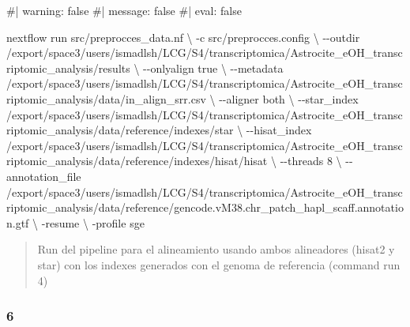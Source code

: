\documentclass[
  10pt,
]{article}
\newenvironment{Shaded}{\begin{snugshade}}{\end{snugshade}}
\newcommand{\NormalTok}[1]{\textcolor[rgb]{0.00,0.23,0.31}{#1}}
\begin{document}
\begin{Shaded}
\begin{Highlighting}[]
\NormalTok{\#| warning: false}
\NormalTok{\#| message: false}
\NormalTok{\#| eval: false}

\NormalTok{nextflow run src/preprocces\_data.nf \textbackslash{}}
\NormalTok{    {-}c src/preprocces.config \textbackslash{}}
\NormalTok{    {-}{-}outdir /export/space3/users/ismadlsh/LCG/S4/transcriptomica/Astrocite\_eOH\_transcriptomic\_analysis/results \textbackslash{}}
\NormalTok{    {-}{-}onlyalign true \textbackslash{}}
\NormalTok{    {-}{-}metadata /export/space3/users/ismadlsh/LCG/S4/transcriptomica/Astrocite\_eOH\_transcriptomic\_analysis/data/in\_align\_srr.csv \textbackslash{}}
\NormalTok{    {-}{-}aligner both \textbackslash{}}
\NormalTok{    {-}{-}star\_index /export/space3/users/ismadlsh/LCG/S4/transcriptomica/Astrocite\_eOH\_transcriptomic\_analysis/data/reference/indexes/star \textbackslash{}}
\NormalTok{    {-}{-}hisat\_index /export/space3/users/ismadlsh/LCG/S4/transcriptomica/Astrocite\_eOH\_transcriptomic\_analysis/data/reference/indexes/hisat/hisat \textbackslash{}}
\NormalTok{    {-}{-}threads 8 \textbackslash{}}
\NormalTok{    {-}{-}annotation\_file /export/space3/users/ismadlsh/LCG/S4/transcriptomica/Astrocite\_eOH\_transcriptomic\_analysis/data/reference/gencode.vM38.chr\_patch\_hapl\_scaff.annotation.gtf \textbackslash{}}
\NormalTok{    {-}resume \textbackslash{}}
\NormalTok{    {-}profile sge}
\end{Highlighting}
\end{Shaded}

\begin{quote}
Run del pipeline para el alineamiento usando ambos alineadores (hisat2 y
star) con los indexes generados con el genoma de referencia (command run
4)
\end{quote}

\subsubsection{6}\label{section-5}
\end{document}
